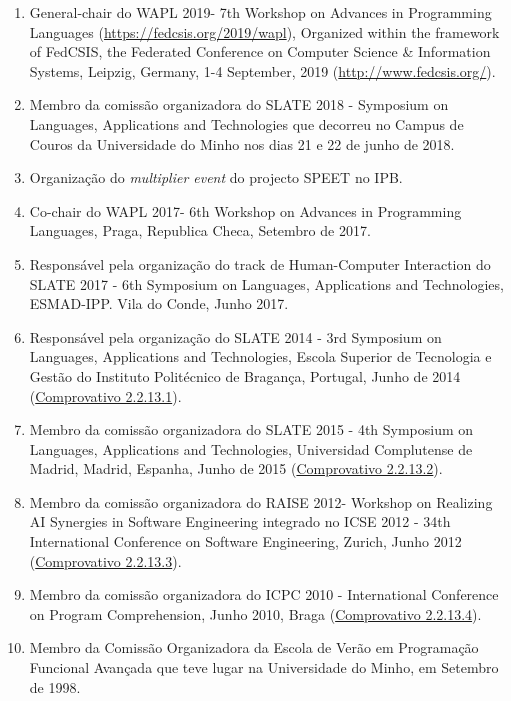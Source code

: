 \documentclass[11pt]{article}
\begin{document}
\begin{enumerate}
\item {General-chair do WAPL 2019- 7th Workshop on Advances in Programming Languages (\url{https://fedcsis.org/2019/wapl}), Organized within the framework of FedCSIS, the Federated Conference on Computer Science & Information Systems, Leipzig, Germany,  1-4 September, 2019 (\url{http://www.fedcsis.org/}).}
\item {Membro da comissão organizadora do SLATE 2018 - Symposium on Languages, Applications and Technologies que decorreu no Campus de Couros da Universidade do Minho nos dias 21 e 22 de junho de 2018.}
\item {Organização do {\em{ {multiplier event}}} do projecto SPEET no IPB.}
\item {Co-chair do WAPL 2017- 6th Workshop on Advances in Programming Languages, Praga, Republica Checa, Setembro de 2017.}
\item {Responsável pela organização do track de Human-Computer Interaction do SLATE 2017 - 6th Symposium on Languages, Applications and Technologies, ESMAD-IPP. Vila do Conde, Junho 2017.}
\item {Responsável pela organização do SLATE 2014 - 3rd Symposium on Languages, Applications and Technologies, Escola Superior de Tecnologia e Gestão do Instituto Politécnico de Bragança, Portugal, Junho de 2014 (\href{run:ComprovativosCOCP/COSLATE2014.pdf}{Comprovativo 2.2.13.1}). }
\item {Membro da comissão organizadora do SLATE 2015 - 4th Symposium on Languages, Applications and Technologies, Universidad Complutense de Madrid, Madrid, Espanha, Junho de 2015 (\href{run:ComprovativosCOCP/COSLATE2015.pdf}{Comprovativo 2.2.13.2}). }
\item {Membro da comissão organizadora do RAISE 2012- Workshop on Realizing AI Synergies in Software Engineering integrado no ICSE 2012 - 34th International Conference on Software Engineering, Zurich, Junho 2012 (\href{run:ComprovativosCOCP/COCPRAISE2012.pdf}{Comprovativo 2.2.13.3}).}
\item {Membro da comissão organizadora do ICPC 2010 - International Conference on Program Comprehension, Junho 2010, Braga (\href{run:ComprovativosCOCP/COICPC10.pdf}{Comprovativo 2.2.13.4}).}
\item {Membro da Comissão Organizadora da Escola de Verão em Programa\-ção Funcional Avançada que teve lugar na Universidade do Minho, em Setembro de 1998.}
\end{enumerate}
\end{document}
